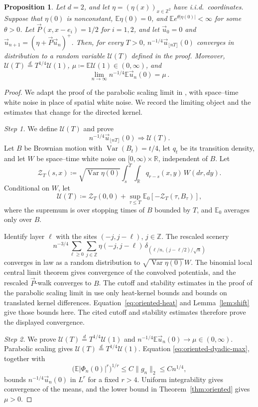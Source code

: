 \documentclass[11pt]{amsart}
\theoremstyle{plain}
\newtheorem{proposition}[theorem]{Proposition}
\theoremstyle{definition}
\newcommand{\Z}{\mathbb{Z}}
\newcommand{\E}{\mathbb{E}}
\DeclareMathOperator{\Var}{Var}
\begin{document}
\begin{proposition}\label{prop:oriented-scaling}
	Let $d=2$, and let $\eta=(\eta(x))_{x\in\Z^2}$ have i.i.d.\ coordinates.
	Suppose that $\eta(0)$ is nonconstant, $\E\eta(0)=0$, and
	$\E e^{\theta|\eta(0)|}<\infty$ for some $\theta>0$. Let $\vec P(x,x-e_i)=1/2$ for $i=1,2$, and let $\vec u_0=0$ and $\vec u_{n+1}=(\eta+\vec P\vec u_n)^+$. Then, for every
	$T>0$, $n^{-1/4}\vec u_{\lfloor nT\rfloor}(0)$ converges in distribution to a random variable $\mathcal U(T)$ defined in the proof. Moreover, $\mathcal U(T)\stackrel d=T^{1/4}\mathcal U(1)$, $\mu\coloneqq\E\mathcal U(1)\in(0,\infty)$, and
	\[
		\lim_{n\to\infty}n^{-1/4}\E \vec u_n(0)=\mu\,.
	\]
\end{proposition}

\begin{proof}
	We adapt the proof of the parabolic scaling limit in \citet{BP}, with
	space--time white noise in place of spatial white noise. We record the
	limiting object and the
	estimates that change for the directed kernel.

	\smallskip
	\noindent\emph{Step 1.} We define $\mathcal U(T)$ and prove
	\[
		n^{-1/4}\vec u_{\lfloor nT\rfloor}(0)
		\Longrightarrow\mathcal U(T).
	\]
	Let $B$ be Brownian motion with $\Var(B_t)=t/4$, let $q_t$ be its
	transition density, and let $W$ be space--time white noise on
	$[0,\infty)\times\mathbb R$, independent of $B$. Let
	\[
		\mathcal Z_T(s,x)\coloneqq
		\sqrt{\Var\eta(0)}\int_s^T\int_{\mathbb R}
		q_{r-s}(x,y)\,W(dr,dy).
	\]
	Conditional on $W$, let
	\[
		\mathcal U(T)\coloneqq\mathcal Z_T(0,0)
		+\sup_{\tau\leq T}\E_0[-\mathcal Z_T(\tau,B_\tau)],
	\]
	where the supremum is over stopping times of $B$ bounded by $T$, and $\E_0$
	averages only over $B$.

	Identify layer $\ell$ with the sites $(-j,j-\ell)$, $j\in\mathbb Z$. The
	rescaled scenery
	\[
		n^{-3/4}\sum_{\ell\geq0}\sum_{j\in\mathbb Z}
		\eta(-j,j-\ell)\,
		\delta_{(\ell/n,(j-\ell/2)/\sqrt n)}
	\]
	converges in law as a random distribution to
	$\sqrt{\Var\eta(0)}W$. The binomial local central limit
	theorem gives convergence of the convolved potentials, and the rescaled
	$\vec P$-walk converges to $B$. The cutoff and stability estimates in the
	proof of the parabolic scaling limit in \citet{BP} use only heat-kernel bounds and
	bounds on translated kernel differences. Equation~\eqref{eq:oriented-heat}
	and Lemma~\ref{lem:shift} give those bounds here. The cited cutoff and
	stability estimates therefore prove the displayed convergence.

	\smallskip
	\noindent\emph{Step 2.} We prove
	$\mathcal U(T)\stackrel d=T^{1/4}\mathcal U(1)$ and
	$n^{-1/4}\E\vec u_n(0)\to\mu\in(0,\infty)$.
	Parabolic scaling gives
	$\mathcal U(T)\stackrel d=T^{1/4}\mathcal U(1)$. Equation
	\eqref{eq:oriented-dyadic-max}, together with
	\[
		\bigl(\E|\Phi_n(0)|^r\bigr)^{1/r}
		\leq C\|g_n\|_2\leq Cn^{1/4},
	\]
	bounds $n^{-1/4}\vec u_n(0)$ in $L^r$ for a fixed $r>4$. Uniform
	integrability gives convergence of the means, and the lower bound in
	Theorem~\ref{thm:oriented} gives $\mu>0$.
\end{proof}
\end{document}
